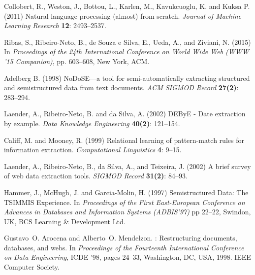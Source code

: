 \documentclass{nle}
\begin{document}
\begin{thebibliography}{}
Collobert, R., Weston, J., Bottou, L., Karlen, M., Kavukcuoglu, K. and Kuksa P. (2011)
Natural language processing (almost) from scratch.
{\it Journal of Machine Learning Research}
{\bf 12}: 2493--2537.

Ribas, S., Ribeiro-Neto, B., de Souza e Silva, E., Ueda, A., and Ziviani, N. (2015)
In {\it Proceedings of the 24th International Conference on World Wide Web (WWW '15 Companion)}, 
pp. 603--608, New York, ACM.

Adelberg B. (1998)
NoDoSE---a tool for semi-automatically extracting structured and semistructured data from text documents.
{\it ACM SIGMOD Record} 
{\bf 27(2)}: 283--294.

Laender, A., Ribeiro-Neto, B. and da Silva, A. (2002)
DEByE - Date extraction by example.
{\it Data Knowledge Engineering}
{\bf 40(2)}: 121--154.

Califf, M. and Mooney, R. (1999)
Relational learning of pattern-match rules for information extraction.
{\it Computational Linguistics}
{\bf 4}: 9--15.

Laender, A., Ribeiro-Neto, B., da Silva, A., and Teixeira, J. (2002)
A brief survey of web data extraction tools.
{\it SIGMOD Record}
{\bf 31(2)}: 84--93.

Hammer, J., McHugh, J. and Garcia-Molin, H. (1997)
Semistructured Data: The TSIMMIS Experience.
In {\it Proceedings of the First East-European Conference on Advances in Databases and Information Systems (ADBIS'97)}
pp 22--22, Swindon, UK, BCS Learning \& Development Ltd.

Gustavo~O. Arocena and Alberto~O. Mendelzon.
: Restructuring documents, databases, and webs.
\newblock In {\em Proceedings of the Fourteenth International Conference on
  Data Engineering}, ICDE '98, pages 24--33, Washington, DC, USA, 1998. IEEE
  Computer Society.




\end{thebibliography}
\end{document}
